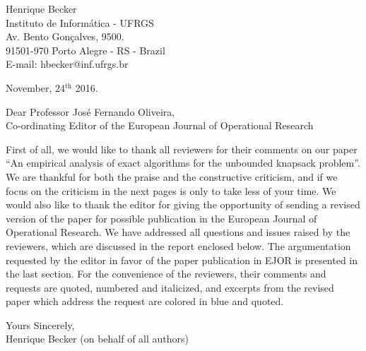 \documentclass{elsarticle}
\begin{document}
\pagestyle{empty}

\vspace{2cm}

\begin{flushright}
   \begin{minipage}{7cm}
      Henrique Becker \\
      Instituto de Informática - UFRGS \\
      Av. Bento Gonçalves, 9500. \\
      91501-970 Porto Alegre - RS - Brazil \\
      E-mail: hbecker@inf.ufrgs.br \\
   \end{minipage}
\end{flushright}

\begin{flushleft}
November, 24$^{\text{th}}$ 2016.

\vspace{1.5cm}

Dear Professor José Fernando Oliveira, \\
Co-ordinating Editor of the European Journal of Operational Research
\end{flushleft}

\medskip
First of all, we would like to thank all reviewers for their comments on our paper ``An empirical analysis of exact algorithms for the unbounded knapsack problem''.
We are thankful for both the praise and the constructive criticism, and if we focus on the criticism in the next pages is only to take less of your time.
We would also like to thank the editor for giving the opportunity of sending a revised version of the paper for possible publication in the European Journal of Operational Research.
We have addressed all questions and issues raised by the reviewers, which are discussed in the report enclosed below.
The argumentation requested by the editor in favor of the paper publication in EJOR is presented in the last section.
For the convenience of the reviewers, their comments and requests are quoted, numbered and italicized, and excerpts from the revised paper which address the request are colored in blue and quoted.

\medskip

\begin{flushleft}
Yours Sincerely,\\
Henrique Becker (on behalf of all authors)
\end{flushleft}

\newpage
\end{document}
